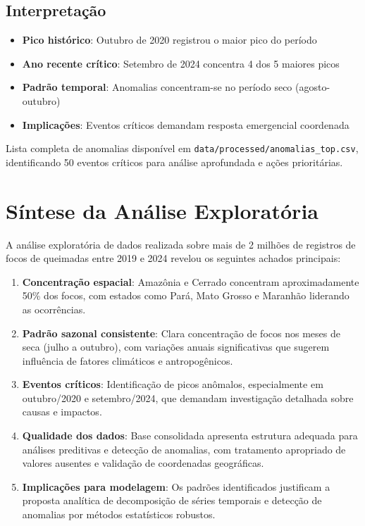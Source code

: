 \documentclass[12pt,a4paper]{report}
\begin{document}
\subsection{Interpretação}

\begin{itemize}
  \item \textbf{Pico histórico}: Outubro de 2020 registrou o maior pico do período
  \item \textbf{Ano recente crítico}: Setembro de 2024 concentra 4 dos 5 maiores picos
  \item \textbf{Padrão temporal}: Anomalias concentram-se no período seco (agosto-outubro)
  \item \textbf{Implicações}: Eventos críticos demandam resposta emergencial coordenada
\end{itemize}

\noindent Lista completa de anomalias disponível em \texttt{data/processed/anomalias\_top.csv}, identificando 50 eventos críticos para análise aprofundada e ações prioritárias.

\section{Síntese da Análise Exploratória}

A análise exploratória de dados realizada sobre mais de 2 milhões de registros de focos de queimadas entre 2019 e 2024 revelou os seguintes achados principais:

\begin{enumerate}
  \item \textbf{Concentração espacial}: Amazônia e Cerrado concentram aproximadamente 50\% dos focos, com estados como Pará, Mato Grosso e Maranhão liderando as ocorrências.
  
  \item \textbf{Padrão sazonal consistente}: Clara concentração de focos nos meses de seca (julho a outubro), com variações anuais significativas que sugerem influência de fatores climáticos e antropogênicos.
  
  \item \textbf{Eventos críticos}: Identificação de picos anômalos, especialmente em outubro/2020 e setembro/2024, que demandam investigação detalhada sobre causas e impactos.
  
  \item \textbf{Qualidade dos dados}: Base consolidada apresenta estrutura adequada para análises preditivas e detecção de anomalias, com tratamento apropriado de valores ausentes e validação de coordenadas geográficas.
  
  \item \textbf{Implicações para modelagem}: Os padrões identificados justificam a proposta analítica de decomposição de séries temporais e detecção de anomalias por métodos estatísticos robustos.
\end{enumerate}
\end{document}
